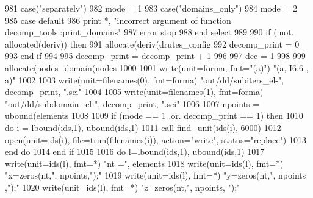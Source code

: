 \begin{DoxyCode}
981         \textcolor{keywordflow}{case}(\textcolor{stringliteral}{"separately"})
982               mode = 1
983         \textcolor{keywordflow}{case}(\textcolor{stringliteral}{"domains\_only"})
984               mode = 2
985 \textcolor{keywordflow}{        case default}
986               print *, \textcolor{stringliteral}{"incorrect argument of function decomp\_tools::print\_domains"}
987               error stop
988 \textcolor{keywordflow}{      end select}
989       
990       \textcolor{keywordflow}{if} (.not. \textcolor{keyword}{allocated}(deriv)) \textcolor{keywordflow}{then}
991         \textcolor{keyword}{allocate}(deriv(drutes_config%
992         decomp\_print = 0
993 \textcolor{keywordflow}{      end if}
994 
995       decomp\_print = decomp\_print + 1
996 
997       dec = 1
998 
999       \textcolor{keyword}{allocate}(nodes\_domain(nodes%
1000 
1001       \textcolor{keyword}{write}(unit=forma, fmt=\textcolor{stringliteral}{"(a)"}) \textcolor{stringliteral}{"(a,  I6.6 , a)"}
1002 
1003       \textcolor{keyword}{write}(unit=filenames(0), fmt=forma) \textcolor{stringliteral}{"out/dd/subiters\_el-"},  decomp\_print\textcolor{comment}{, }\textcolor{stringliteral}{".sci"}
1004 
1005       \textcolor{keyword}{write}(unit=filenames(1), fmt=forma) \textcolor{stringliteral}{"out/dd/subdomain\_el-"},  decomp\_print\textcolor{comment}{, }\textcolor{stringliteral}{".sci"}
1006 
1007       npoints = ubound(elements%
1008       
1009       \textcolor{keywordflow}{if} (mode == 1 .or. decomp\_print == 1) \textcolor{keywordflow}{then}
1010         \textcolor{keywordflow}{do} i = lbound(ids,1), ubound(ids,1)
1011           \textcolor{keyword}{call }find_unit(ids(i), 6000)
1012           \textcolor{keyword}{open}(unit=ids(i), file=trim(filenames(i)), action=\textcolor{stringliteral}{"write"}, status\textcolor{comment}{=}\textcolor{stringliteral}{"replace"}\textcolor{comment}{)}
1013 \textcolor{comment}{}\textcolor{keywordflow}{        end do}
1014 \textcolor{keywordflow}{      end if}
1015 
1016       \textcolor{keywordflow}{do} l=lbound(ids,1), ubound(ids,1)   
1017         \textcolor{keyword}{write}(unit=ids(l), fmt=*) \textcolor{stringliteral}{"nt ="}, elements%
1018         \textcolor{keyword}{write}(unit=ids(l), fmt=*) \textcolor{stringliteral}{"x=zeros(nt,"}, npoints,\textcolor{stringliteral}{");"}
1019         \textcolor{keyword}{write}(unit=ids(l), fmt=*) \textcolor{stringliteral}{"y=zeros(nt,"}, npoints ,\textcolor{stringliteral}{");"}
1020         \textcolor{keyword}{write}(unit=ids(l), fmt=*) \textcolor{stringliteral}{"z=zeros(nt,"}, npoints, \textcolor{stringliteral}{");"}

\end{DoxyCode}
